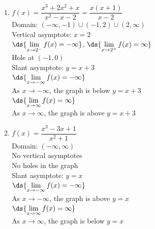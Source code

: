 \documentclass{ximera}
\begin{document}
\begin{multicols}{2}
\begin{enumerate}
\setcounter{enumi}{\value{HW}}


\item $f(x) = \dfrac{x^3+2x^2+x}{x^{2} -x-2} = \dfrac{x(x+1)}{x - 2}$\\
Domain: $(-\infty, -1) \cup (-1, 2) \cup (2, \infty)$\\
Vertical asymptote: $x = 2$\\
$\ds{\lim_{x \rightarrow 2^{-}} f(x)=  -\infty}$, $\ds{\lim_{x \rightarrow 2^{+}} f(x)=  \infty}$ \\
Hole at $(-1,0)$ \\
Slant asymptote: $y=x+3$ \\
$\ds{\lim_{x \rightarrow -\infty} f(x) = -\infty}$\\
As $x \rightarrow -\infty$, the graph is below $y=x+3$\\
$\ds{\lim_{x \rightarrow \infty} f(x) = \infty}$\\
As $x \rightarrow \infty$, the graph is above $y=x+3$\\

\vfill

\columnbreak

\item $f(x) = \dfrac{x^3-3x+1}{x^2+1}$\\
Domain: $(-\infty, \infty)$\\
No vertical asymptotes \\
No holes in the graph \\
Slant asymptote: $y=x$ \\
$\ds{\lim_{x \rightarrow -\infty} f(x) = -\infty}$\\
As $x \rightarrow -\infty$, the graph is above $y=x$ \\
$\ds{\lim_{x \rightarrow \infty} f(x) = \infty}$\\
As $x \rightarrow \infty$, the graph is below $y=x$  \\


\setcounter{HW}{\value{enumi}}
\end{enumerate}
\end{multicols}
\end{document}
